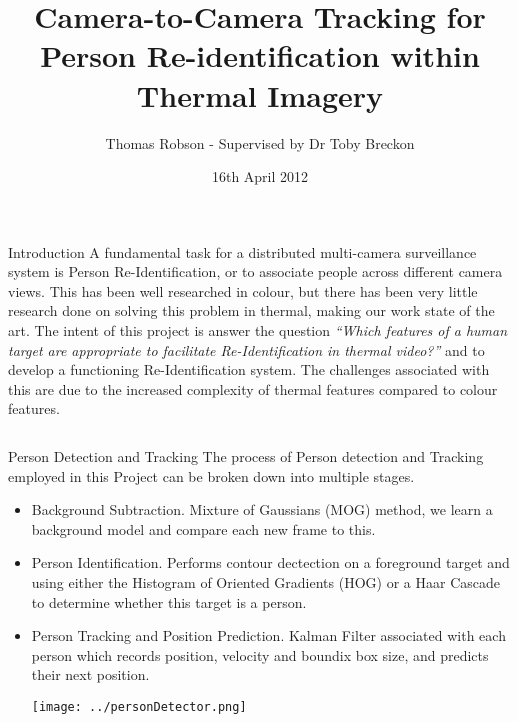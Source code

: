 \documentclass[final]{beamer}
\title[Thermal Re-ID]{Camera-to-Camera Tracking for Person Re-identification within Thermal Imagery}
\author[G Ingram]{Thomas Robson - Supervised by Dr Toby Breckon}
\institute[Durham]{School of Engineering and Computing Sciences, Durham University}
\date{16th April 2012}
\begin{document}
  \begin{frame}{} 

  \vfill
  \begin{block}{Introduction}
  \justify
          A fundamental task for a distributed multi-camera surveillance system is Person Re-Identification, or to associate people across different camera views. This has been well researched in colour, but there has been very little research done on solving this problem in thermal, making our work state of the art. 
\justify
The intent of this project is answer the question {\textit{``Which features of a human target are appropriate to facilitate Re-Identification in thermal video?''}} and to develop a functioning Re-Identification system. The challenges associated with this are due to the increased complexity of thermal features compared to colour features.
        \end{block}
        
    \begin{columns}[t]
      \begin{column}{.49\linewidth}
        
        \begin{block}{Person Detection and Tracking}
        	The process of Person detection and Tracking employed in this Project can be broken down into multiple stages. 
        	\begin{itemize}
        	\item Background Subtraction. Mixture of Gaussians (MOG) method, we learn a background model and compare each new frame to this. 

        	\item Person Identification. Performs contour dectection on a foreground target and using either the Histogram of Oriented Gradients (HOG) or a Haar Cascade to determine whether this target is a person.
        	
        	\item Person Tracking and Position Prediction. Kalman Filter associated with each person which records position, velocity and boundix box size, and predicts their next position. 
        	
        \texttt{[image: ../personDetector.png]}  
          \end{itemize}
        \end{block}




\end{column}
\end{columns}
\end{frame}
\end{document}
